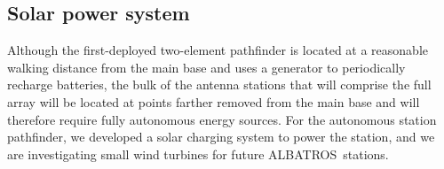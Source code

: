 \documentclass{ws-jai}
\def\albatros{ALBATROS}
\begin{document}

\subsection{Solar power system}

Although the first-deployed two-element pathfinder is located at a
reasonable walking distance from the main base and uses a generator to
periodically recharge batteries, the bulk of the antenna stations that
will comprise the full array will be located at points farther removed
from the main base and will therefore require fully autonomous energy
sources.  For the autonomous station pathfinder, we developed a solar
charging system to power the station, and we are investigating small
wind turbines for future \albatros\ stations.
\end{document}
